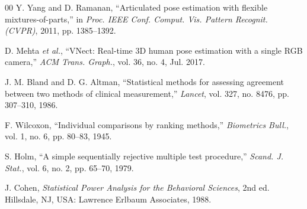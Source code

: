 \documentclass[conference]{IEEEtran}
\begin{document}
\begin{thebibliography}{00}
Y. Yang and D. Ramanan, ``Articulated pose estimation with flexible
mixtures-of-parts,'' in \textit{Proc. IEEE Conf. Comput. Vis. Pattern
Recognit. (CVPR)}, 2011, pp. 1385--1392.

D. Mehta \textit{et al.}, ``VNect: Real-time 3D human pose estimation
with a single RGB camera,'' \textit{ACM Trans. Graph.}, vol. 36, no. 4,
Jul. 2017.

J. M. Bland and D. G. Altman, ``Statistical methods for assessing
agreement between two methods of clinical measurement,'' \textit{Lancet},
vol. 327, no. 8476, pp. 307--310, 1986.

F. Wilcoxon, ``Individual comparisons by ranking methods,''
\textit{Biometrics Bull.}, vol. 1, no. 6, pp. 80--83, 1945.

S. Holm, ``A simple sequentially rejective multiple test procedure,''
\textit{Scand. J. Stat.}, vol. 6, no. 2, pp. 65--70, 1979.

J. Cohen, \textit{Statistical Power Analysis for the Behavioral
Sciences}, 2nd ed. Hillsdale, NJ, USA: Lawrence Erlbaum Associates, 1988.

\end{thebibliography}
\end{document}
